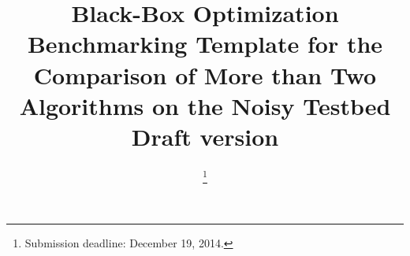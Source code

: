 \documentclass[conference]{IEEEtran}
\begin{document}
%
\title{Black-Box Optimization Benchmarking Template for the Comparison of More than Two Algorithms on the Noisy Testbed\\ {\large Draft version}}

\author{
\thanks{Submission deadline: December 19, 2014.}
}

\IEEEoverridecommandlockouts

% 
\end{document}
